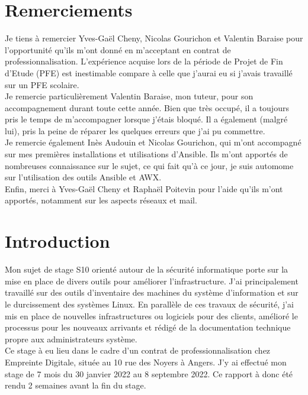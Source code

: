\documentclass[12pt]{article}
\begin{document}
\newpage
\section{Remerciements}
Je tiens à remercier Yves-Gaël Cheny, Nicolas Gourichon et Valentin Baraise pour l'opportunité qu'ils m'ont donné en m'acceptant en contrat de professionnalisation. 
L'expérience acquise lors de la période de Projet de Fin d'Etude (PFE) est inestimable compare à celle que j'aurai eu si j'avais travaillé sur un PFE scolaire. \\

Je remercie particulièrement Valentin Baraise, mon tuteur, pour son accompagnement durant toute cette année. 
Bien que très occupé, il a toujours pris le temps de m'accompagner lorsque j'étais bloqué. 
Il a également (malgré lui), pris la peine de réparer les quelques erreurs que j'ai pu commettre. \\

Je remercie également Inès Audouin et Nicolas Gourichon, qui m'ont accompagné sur mes premières installations et utilisations d'Ansible. 
Ils m'ont apportés de nombreuses connaissance sur le sujet, ce qui fait qu'à ce jour, je suis automome sur l'utilisation des outils Ansible et AWX. \\

Enfin, merci à Yves-Gaël Cheny et Raphaël Poitevin pour l'aide qu'ils m'ont apportés, notamment sur les aspects réseaux et mail.


\newpage
\tableofcontents

\newpage
\section{Introduction}
Mon sujet de stage S10 orienté autour de la sécurité informatique porte sur la mise en place de divers outils pour améliorer l'infrastructure. 
J'ai principalement travaillé sur des outils d'inventaire des machines du système d'information et sur le durcissement des systèmes Linux. 
En parallèle de ces travaux de sécurité, j'ai mis en place de nouvelles infrastructures ou logiciels pour des clients, amélioré le processus pour les nouveaux arrivants et rédigé de la documentation technique propre aux administrateurs système. \\

Ce stage à eu lieu dans le cadre d'un contrat de professionnalisation chez Empreinte Digitale, située au 10 rue des Noyers à Angers. 
J'y ai effectué mon stage de 7 mois du 30 janvier 2022 au 8 septembre 2022. 
Ce rapport à donc été rendu 2 semaines avant la fin du stage. \\
\end{document}
